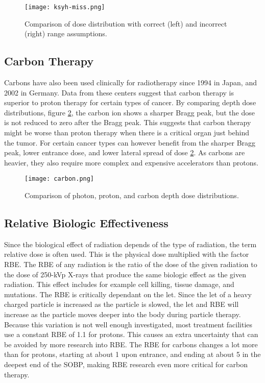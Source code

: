 \documentclass[../main/thesis.tex]{subfiles}
\begin{document}
\begin{figure}[h]
	\centering
	\texttt{[image: ksyh-miss.png]}
	\caption{Comparison of dose distribution with correct (left) and incorrect (right) range assumptions. \citep{ksyh-phys251}}
	\label{fig-miss}
\end{figure}


\newpage
\subsection{Carbon Therapy}
\label{t-carbon}
Carbons have also been used clinically for radiotherapy since 1994 in Japan, and 2002 in Germany. Data from these centers suggest that carbon therapy is superior to proton therapy for certain types of cancer. By comparing depth dose distributions, figure \ref{fig-carbon}, the carbon ion shows a sharper Bragg peak, but the dose is not reduced to zero after the Bragg peak. This suggests that carbon therapy might be worse than proton therapy when there is a critical organ just behind the tumor. For certain cancer types can however benefit from the sharper Bragg peak, lower entrance dose, and lower lateral spread of dose \ref{fig-carbon}. As carbons are heavier, they also require more complex and expensive accelerators than protons. \citep{ksyh-phys251}

\begin{figure}[h]
	\centering
	\texttt{[image: carbon.png]}
	\caption{Comparison of photon, proton, and carbon depth dose distributions. \citep{ksyh-phys251}}
	\label{fig-carbon}
\end{figure}

\subsection{Relative Biologic Effectiveness}
\label{t-rbe}

Since the biological effect of radiation depends of the type of radiation, the term relative dose is often used. This is the physical dose multiplied with the factor \gls{RBE}. The \gls{RBE} of any radiation is the ratio of the dose of the given radiation to the dose of 250-kVp X-rays that produce the same biologic effect as the given radiation. This effect includes for example cell killing, tissue damage, and mutations. The \gls{RBE} is critically dependant on the \gls{let}. Since the \gls{let} of a heavy charged particle is increased as the particle is slowed, the \gls{let} and \gls{RBE} will increase as the particle moves deeper into the body during particle therapy. Because this variation is not well enough investigated, most treatment facilities use a constant \gls{RBE} of 1.1 for protons. This causes an extra uncertainty that can be avoided by more research into \gls{RBE}. The \gls{RBE} for carbons changes a lot more than for protons, starting at about 1 upon entrance, and ending at about 5 in the deepest end of the \gls{SOBP}, making \gls{RBE} research even more critical for carbon therapy. \citep[chap. 27]{Khan} \citep{ksyh-phys251}
\end{document}
